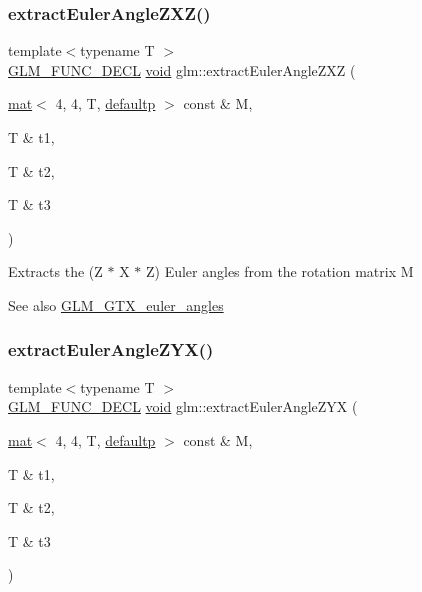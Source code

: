 \subsubsection{\texorpdfstring{extract\+Euler\+Angle\+Z\+X\+Z()}{extractEulerAngleZXZ()}}
{\footnotesize\ttfamily template$<$typename T $>$ \\
\mbox{\hyperlink{setup_8hpp_ab2d052de21a70539923e9bcbf6e83a51}{G\+L\+M\+\_\+\+F\+U\+N\+C\+\_\+\+D\+E\+CL}} \mbox{\hyperlink{_s_d_l__opengles2__gl2ext_8h_ae5d8fa23ad07c48bb609509eae494c95}{void}} glm\+::extract\+Euler\+Angle\+Z\+XZ (\begin{DoxyParamCaption}\item[{\mbox{\hyperlink{structglm_1_1mat}{mat}}$<$ 4, 4, T, \mbox{\hyperlink{namespaceglm_a36ed105b07c7746804d7fdc7cc90ff25a9d21ccd8b5a009ec7eb7677befc3bf51}{defaultp}} $>$ const \&}]{M,  }\item[{T \&}]{t1,  }\item[{T \&}]{t2,  }\item[{T \&}]{t3 }\end{DoxyParamCaption})}

Extracts the (Z $\ast$ X $\ast$ Z) Euler angles from the rotation matrix M \begin{DoxySeeAlso}{See also}
\mbox{\hyperlink{group__gtx__euler__angles}{G\+L\+M\+\_\+\+G\+T\+X\+\_\+euler\+\_\+angles}} 
\end{DoxySeeAlso}
\mbox{\label{group__gtx__euler__angles_ga2d6c11a4abfa60c565483cee2d3f7665}} 
\subsubsection{\texorpdfstring{extract\+Euler\+Angle\+Z\+Y\+X()}{extractEulerAngleZYX()}}
{\footnotesize\ttfamily template$<$typename T $>$ \\
\mbox{\hyperlink{setup_8hpp_ab2d052de21a70539923e9bcbf6e83a51}{G\+L\+M\+\_\+\+F\+U\+N\+C\+\_\+\+D\+E\+CL}} \mbox{\hyperlink{_s_d_l__opengles2__gl2ext_8h_ae5d8fa23ad07c48bb609509eae494c95}{void}} glm\+::extract\+Euler\+Angle\+Z\+YX (\begin{DoxyParamCaption}\item[{\mbox{\hyperlink{structglm_1_1mat}{mat}}$<$ 4, 4, T, \mbox{\hyperlink{namespaceglm_a36ed105b07c7746804d7fdc7cc90ff25a9d21ccd8b5a009ec7eb7677befc3bf51}{defaultp}} $>$ const \&}]{M,  }\item[{T \&}]{t1,  }\item[{T \&}]{t2,  }\item[{T \&}]{t3 }\end{DoxyParamCaption})}

